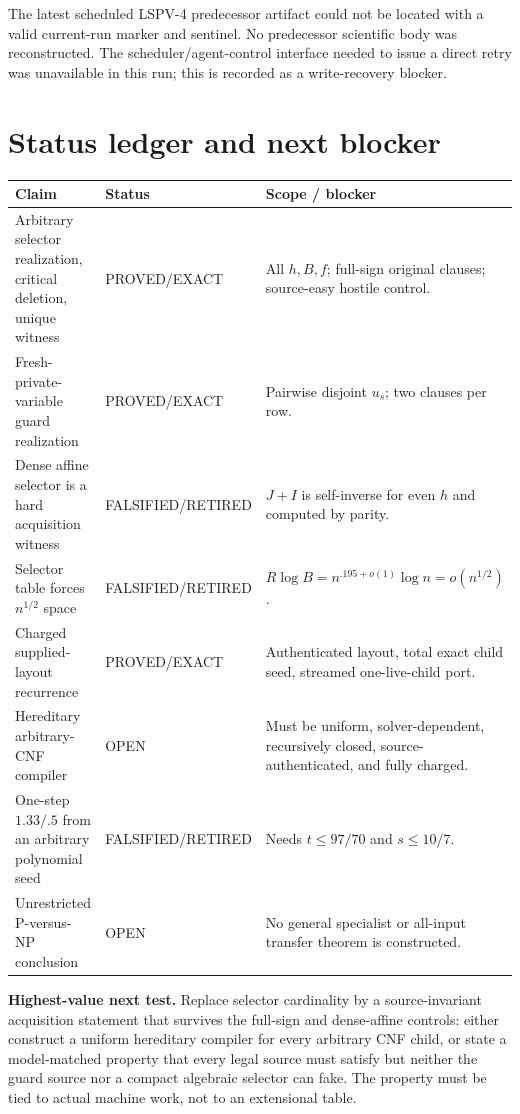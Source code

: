 \documentclass[11pt]{article}
\begin{document}
The latest scheduled LSPV-4 predecessor artifact could not be located with a valid current-run marker and sentinel.  No predecessor scientific body was reconstructed.  The scheduler/agent-control interface needed to issue a direct retry was unavailable in this run; this is recorded as a write-recovery blocker.

\section{Status ledger and next blocker}

\begin{center}
\begin{tabular}{p{.30\linewidth}p{.17\linewidth}p{.45\linewidth}}
\toprule
Claim & Status & Scope / blocker\\
\midrule
Arbitrary selector realization, critical deletion, unique witness & PROVED/EXACT & All $h,B,f$; full-sign original clauses; source-easy hostile control.\\
Fresh-private-variable guard realization & PROVED/EXACT & Pairwise disjoint $u_s$; two clauses per row.\\
Dense affine selector is a hard acquisition witness & FALSIFIED/RETIRED & $J+I$ is self-inverse for even $h$ and computed by parity.\\
Selector table forces $n^{1/2}$ space & FALSIFIED/RETIRED & $R\log B=n^{.195+o(1)}\log n=o(n^{1/2})$.\\
Charged supplied-layout recurrence & PROVED/EXACT & Authenticated layout, total exact child seed, streamed one-live-child port.\\
Hereditary arbitrary-CNF compiler & OPEN & Must be uniform, solver-dependent, recursively closed, source-authenticated, and fully charged.\\
One-step $1.33/.5$ from an arbitrary polynomial seed & FALSIFIED/RETIRED & Needs $t\le97/70$ and $s\le10/7$.\\
Unrestricted P-versus-NP conclusion & OPEN & No general specialist or all-input transfer theorem is constructed.\\
\bottomrule
\end{tabular}
\end{center}

\textbf{Highest-value next test.}  Replace selector cardinality by a source-invariant acquisition statement that survives the full-sign and dense-affine controls: either construct a uniform hereditary compiler for every arbitrary CNF child, or state a model-matched property that every legal source must satisfy but neither the guard source nor a compact algebraic selector can fake.  The property must be tied to actual machine work, not to an extensional table.
\end{document}

